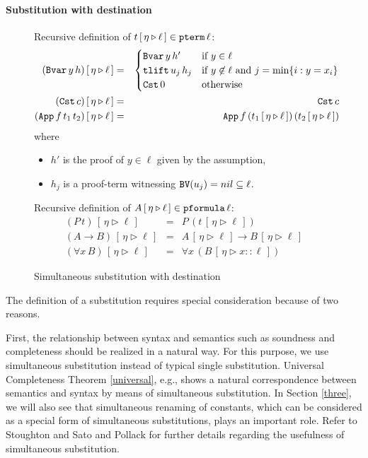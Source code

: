 \documentclass{svjour3}                     %
\newcommand{\substa}[3]{#1\,[\,#2 \triangleright #3\,]}
\newcommand{\menge}[2]{\{ #1 : #2 \}}
\newcommand{\tm}{\subseteq}
\newcommand{\tApp}{\textup{\tt App}}
\newcommand{\tBvar}{\textup{\tt Bvar}}
\newcommand{\tCst}{\textup{\tt Cst}}
\newcommand{\tpterm}{\textup{\tt pterm}}
\newcommand{\tpfml}{\textup{\tt pformula}}
\newcommand{\tPH}{\textup{\tt BV}}
\newcommand{\ttlift}{\textup{\tt tlift}}
\begin{document}
\paragraph{\bf Substitution with destination}
\begin{figure}[t]
  Recursive definition of $\substa{t}{\eta}{\ell} \in \tpterm\, \ell$:
  \begin{eqnarray}
    \substa{(\tBvar\, y \, h)}{\eta}{\ell} & = &
    \begin{cases}
      \tBvar\, y\, h' & \text{if $y \in \ell$}\\
      \ttlift\, u_j\, h_j & \text{if $y \not\in\ell$ and $j = \min \menge{i}{y = x_i}$} \\
      \tCst \, 0 & \text{otherwise}
    \end{cases} \label{bvar-case} \\
    \substa{(\tCst\, c)}{\eta}{\ell} & = & \tCst\, c \nonumber \\
    \substa{(\tApp\, f\, t_1\, t_2)}{\eta}{\ell} & = & \tApp\, f\, (\substa{t_1}{\eta}{\ell})\, (\substa{t_2}{\eta}{\ell}) \nonumber
  \end{eqnarray}
  where
  \begin{itemize}
  \item $h'$ is the proof of $y \in \ell$ given by the assumption,
  \item $h_j$ is a proof-term witnessing $\tPH(u_j) = nil \tm \ell$. \smallskip
  \end{itemize}

Recursive definition of $\substa{A}{\eta}{\ell} \in \tpfml\, \ell$:
\begin{eqnarray}
  \substa{(P\, t)}{\eta}{\ell} & = & P\, (\substa{t}{\eta}{\ell}) \nonumber\\
  \substa{(A \to B)}{\eta}{\ell} & = & \substa{A}{\eta}{\ell} \to \substa{B}{\eta}{\ell} \nonumber\\
  \substa{(\forall x\, B)}{\eta}{\ell} & = & \forall x\, (\substa{B}{\eta}{x::\ell})\label{allBinder}
\end{eqnarray}
\hrulefill
\caption{Simultaneous substitution with destination}
  \label{fig:substitution}
\end{figure}

The definition of a substitution requires special consideration because of two reasons.

First, the relationship between syntax and semantics such as soundness and completeness should be realized in a natural way.
For this purpose, we use simultaneous substitution instead of typical single substitution.
Universal Completeness Theorem \ref{universal}, e.g., shows a natural correspondence between semantics and syntax by means of simultaneous substitution. In Section \ref{three}, we will also see that simultaneous renaming of constants, which can be considered as a special form of simultaneous substitutions, plays an important role. Refer to Stoughton \cite{Stoughton88} and Sato and Pollack \cite{sapol} for further details regarding the usefulness of simultaneous substitution.
\end{document}
